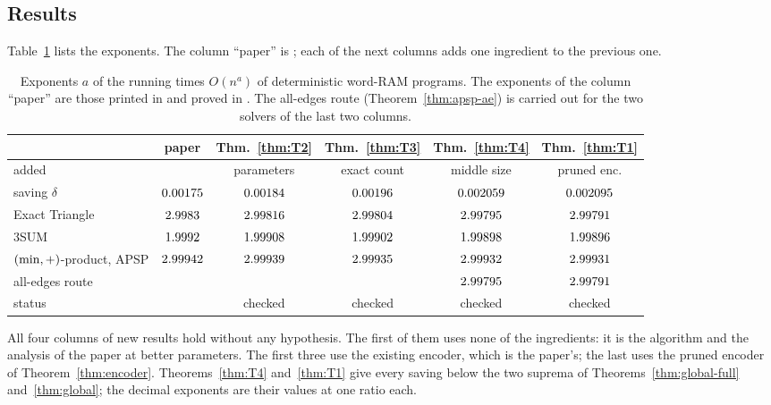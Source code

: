 \subsection*{Results}

Table~\ref{tab:results} lists the exponents.  The column ``paper'' is
\cite{AV}; each of the next columns adds one ingredient to the previous one.

\begin{table}[ht]
\centering\small
\setlength{\tabcolsep}{5pt}
\begin{tabular}{lccccc}
\toprule
 & paper
 & Thm.~\ref{thm:T2}
 & Thm.~\ref{thm:T3}
 & Thm.~\ref{thm:T4}
 & Thm.~\ref{thm:T1}\\
\midrule
added & & parameters & exact count & middle size & pruned enc.\\
saving \(\delta\)
 & \(0.00175\) & \(0.00184\) & \(0.00196\) & \(0.002059\) & \(0.002095\)\\
Exact Triangle
 & \(2.9983\) & \(2.99816\) & \(2.99804\) & \(2.99795\) & \(2.99791\)\\
3SUM
 & \(1.9992\) & \(1.99908\) & \(1.99902\)
 & \(1.99898\) & \(1.99896\)\\
\((\min,+)\)-product, APSP
 & \(2.99942\) & \(2.99939\) & \(2.99935\) & \(2.99932\) & \(2.99931\)\\
\quad all-edges route
 & & & & \(2.99795\) & \(2.99791\)\\
\midrule
status & \cite{upstream} & checked & checked & checked & checked\\
\bottomrule
\end{tabular}
\caption{Exponents \(a\) of the running times \(O(n^{a})\) of deterministic
word-RAM programs.  The exponents of the column ``paper'' are those printed in
\cite{AV} and proved in \cite{upstream}.  The all-edges route
(Theorem~\ref{thm:apsp-ae}) is carried out for the two solvers of the last two
columns.}
\label{tab:results}
\end{table}

All four columns of new results hold without any hypothesis.  The first of
them uses none of the ingredients: it is the algorithm and the analysis of the
paper at better parameters.  The first three use the existing encoder, which is
the paper's; the last uses the pruned encoder of Theorem~\ref{thm:encoder}.
Theorems~\ref{thm:T4} and~\ref{thm:T1} give every saving below the two suprema
of Theorems~\ref{thm:global-full} and~\ref{thm:global}; the decimal exponents
are their values at one ratio each.

